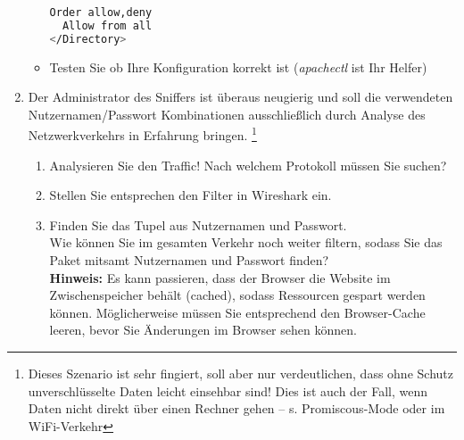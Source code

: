 \documentclass[paper=a4,fontsize=11pt]{scrartcl}%
\begin{document}
\begin{enumerate}
\begin{itemize}
\begin{lstlisting}[style=Bash, language=Bash]
  Order allow,deny
  Allow from all
</Directory>
\end{lstlisting} \label{conf}
	\item Testen Sie ob Ihre Konfiguration korrekt ist (\emph{apachectl} ist Ihr Helfer)
	\end{itemize}
	\item Der Administrator des Sniffers ist überaus neugierig und soll die verwendeten Nutzernamen/Passwort Kombinationen ausschließlich durch Analyse des Netzwerkverkehrs in Erfahrung bringen. \footnote{Dieses Szenario ist sehr fingiert, soll aber nur verdeutlichen, dass ohne Schutz unverschlüsselte Daten leicht einsehbar sind! Dies ist auch der Fall, wenn Daten nicht direkt über einen Rechner gehen -- s. Promiscous-Mode oder im WiFi-Verkehr}
		\begin{enumerate}
			\item Analysieren Sie den Traffic! Nach welchem Protokoll müssen Sie suchen?
			\item Stellen Sie entsprechen den Filter in Wireshark ein.
			\item Finden Sie das Tupel aus Nutzernamen und Passwort.\\
		Wie können Sie im gesamten Verkehr noch weiter filtern, sodass Sie das Paket mitsamt Nutzernamen und Passwort finden?\\
		\textbf{Hinweis:} Es kann passieren, dass der Browser die Website im Zwischenspeicher behält (cached), sodass Ressourcen gespart werden können. Möglicherweise müssen Sie entsprechend den Browser-Cache leeren, bevor Sie Änderungen im Browser sehen können.
		\end{enumerate}
\end{enumerate}
\end{document}
